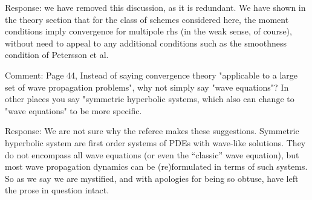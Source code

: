 
Response: we have removed this discussion, as it is redundant. We have shown in the theory section that for the class of schemes considered here, the moment conditions imply convergence for multipole rhs (in the weak sense, of course), without need to appeal to any additional conditions such as the smoothness condition of  Petersson et al.

Comment: Page 44, Instead of saying convergence theory "applicable to a large set of wave propagation problems", why not
simply say "wave equations"? In other places you say "symmetric hyperbolic systems, which also can change to
"wave equations" to be more specific.


Response: We are not sure why the referee makes these suggestions. Symmetric hyperbolic system are first order systems of PDEs with wave-like solutions. They do not encompass all wave equations (or even the ``classic'' wave equation), but most wave propagation dynamics can be (re)formulated in terms of such systems. So as we say we are mystified, and with apologies for being so obtuse, have left the prose in question intact.
